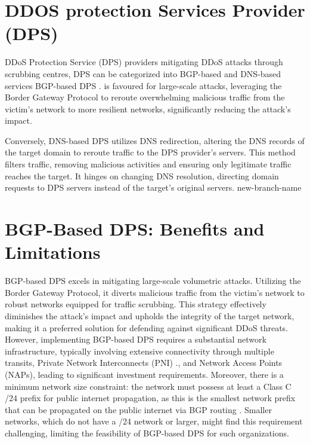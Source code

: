 \section{DDOS protection Services Provider (DPS)}\label{sec:DPS}
DDoS Protection Service (DPS) providers mitigating DDoS attacks through scrubbing centres, DPS can be categorized into BGP-based and DNS-based services BGP-based DPS \cite{tung2018understanding}. is favoured for large-scale attacks, leveraging the Border Gateway Protocol to reroute overwhelming malicious traffic from the victim's network to more resilient networks, significantly reducing the attack's impact.

Conversely, DNS-based DPS utilizes DNS redirection, altering the DNS records of the target domain to reroute traffic to the DPS provider’s servers. This method filters traffic, removing malicious activities and ensuring only legitimate traffic reaches the target. It hinges on changing DNS resolution, directing domain requests to DPS servers instead of the target's original servers.
new-branch-name
\section{BGP-Based DPS: Benefits and Limitations}\label{sec:BDPS_benefits}
BGP-based DPS excels in mitigating large-scale volumetric attacks. Utilizing the Border Gateway Protocol, it diverts malicious traffic from the victim's network to robust networks equipped for traffic scrubbing. This strategy effectively diminishes the attack's impact and upholds the integrity of the target network, making it a preferred solution for defending against significant DDoS threats. However, implementing BGP-based DPS requires a substantial network infrastructure, typically involving extensive connectivity through multiple transits, Private Network Interconnects (PNI) \cite{chatzis2013there}., and Network Access Points (NAPs), leading to significant investment requirements. Moreover, there is a minimum network size constraint: the network must possess at least a Class C /24 prefix for public internet propagation, as this is the smallest network prefix that can be propagated on the public internet via BGP routing \cite{caesar2005bgp}. Smaller networks, which do not have a /24 network or larger, might find this requirement challenging, limiting the feasibility of BGP-based DPS for such organizations.

